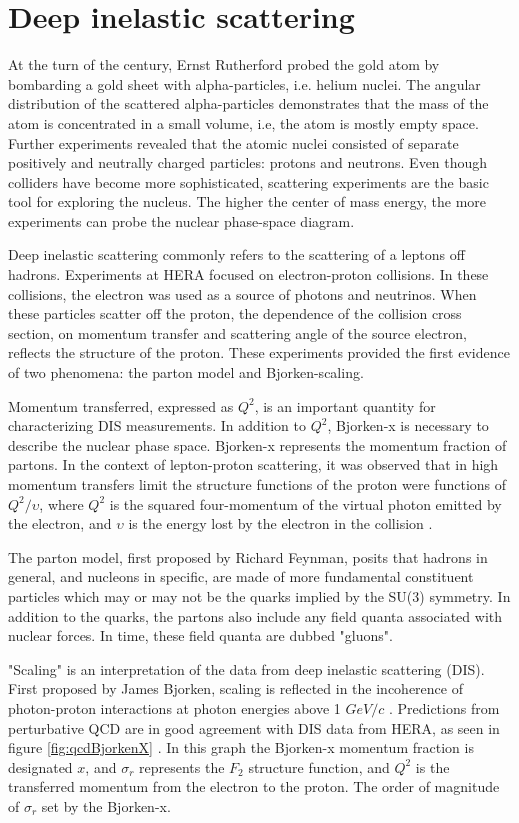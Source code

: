 \section{Deep inelastic scattering}

At the turn of the century, Ernst Rutherford probed the gold atom by bombarding a gold sheet with alpha-particles, i.e. helium nuclei. The angular distribution of the scattered alpha-particles demonstrates that the mass of the atom is concentrated in a small volume, i.e, the atom is mostly empty space. Further experiments revealed that the atomic nuclei consisted of separate positively and neutrally charged particles: protons and neutrons. Even though colliders have become more sophisticated, scattering experiments are the basic tool for exploring the nucleus. The higher the center of mass energy, the more experiments can probe the nuclear phase-space diagram.

Deep inelastic scattering commonly refers to the scattering of a leptons off hadrons. Experiments at HERA focused on electron-proton collisions. In these collisions, the electron was used as a source of photons and neutrinos. When these particles scatter off the proton, the dependence of the collision cross section, on momentum transfer and scattering angle of the source electron, reflects the structure of the proton. These experiments provided the first evidence of two phenomena: the parton model and Bjorken-scaling. 

Momentum transferred, expressed as $Q^2$, is an important quantity for characterizing DIS measurements. In addition to $Q^2$, Bjorken-x is necessary to describe the nuclear phase space. Bjorken-x represents the momentum fraction of partons. In the context of lepton-proton scattering, it was observed that in high momentum transfers limit the structure functions of the proton were functions of $Q^2/\upsilon$, where $Q^2$ is the squared four-momentum of the virtual photon emitted by the electron, and $\upsilon$ is the energy lost by the electron in the collision \cite{Bjorken:1968dy}. 

The parton model, first proposed by Richard Feynman, posits that hadrons in general, and nucleons in specific, are made of more fundamental constituent particles which may or may not be the quarks implied by the SU(3) symmetry. In addition to the quarks, the partons also include any field quanta associated with nuclear forces. In time, these field quanta are dubbed "gluons".

"Scaling" is an interpretation of the data from deep inelastic scattering (DIS). First proposed by James Bjorken, scaling is reflected in the incoherence of photon-proton interactions at photon energies above 1 $GeV/c$ \cite{Bjorken:1982qr}. Predictions from perturbative QCD are in good agreement with DIS data from HERA, as seen in figure \ref{fig:qcdBjorkenX} \cite{Shimizu:2009fc}. In this graph the Bjorken-x momentum fraction is designated $x$, and $\sigma_r$ represents the $F_2$ structure function, and $Q^2$ is the transferred momentum from the electron to the proton. The order of magnitude of $\sigma_r$ set by the Bjorken-x.

